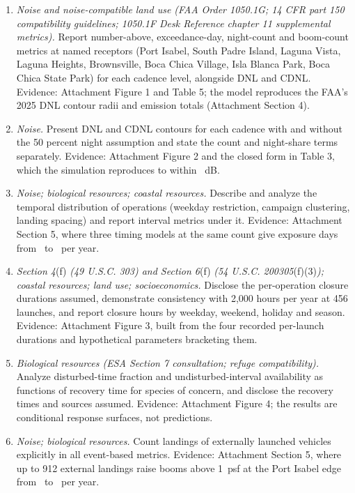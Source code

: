 \documentclass[11pt]{article}
\begin{document}
\begin{enumerate}[leftmargin=*, itemsep=2pt]
\item \textit{Noise and noise-compatible land use (FAA Order 1050.1G; 14 CFR part 150 compatibility guidelines; 1050.1F Desk Reference chapter 11 supplemental metrics).} Report number-above, exceedance-day, night-count and boom-count metrics at named receptors (Port Isabel, South Padre Island, Laguna Vista, Laguna Heights, Brownsville, Boca Chica Village, Isla Blanca Park, Boca Chica State Park) for each cadence level, alongside DNL and CDNL. Evidence: Attachment Figure 1 and Table 5; the model reproduces the FAA's 2025 DNL contour radii and emission totals (Attachment Section 4).
\item \textit{Noise.} Present DNL and CDNL contours for each cadence with and without the 50 percent night assumption and state the count and night-share terms separately. Evidence: Attachment Figure 2 and the closed form in Table 3, which the simulation reproduces to within \valEThreeNightCfMaxabsdiffDbOneDp~dB.
\item \textit{Noise; biological resources; coastal resources.} Describe and analyze the temporal distribution of operations (weekday restriction, campaign clustering, landing spacing) and report interval metrics under it. Evidence: Attachment Section 5, where three timing models at the same count give exposure days from \valETwoCampaignDaysNineZeroSpi~to \valETwoPoissonDaysNineZeroSpi~per year.
\item \textit{Section 4\nocorr}{\upshape(f)}\textit{ (49 U.S.C. 303) and Section 6\nocorr}{\upshape(f)}\textit{ (54 U.S.C. 200305\nocorr}{\upshape(f)(3)}\textit{); coastal resources; land use; socioeconomics.} Disclose the per-operation closure durations assumed, demonstrate consistency with 2,000 hours per year at 456 launches, and report closure hours by weekday, weekend, holiday and season. Evidence: Attachment Figure 3, built from the four recorded per-launch durations and hypothetical parameters bracketing them.
\item \textit{Biological resources (ESA Section 7 consultation; refuge compatibility).} Analyze disturbed-time fraction and undisturbed-interval availability as functions of recovery time for species of concern, and disclose the recovery times and sources assumed. Evidence: Attachment Figure 4; the results are conditional response surfaces, not predictions.
\item \textit{Noise; biological resources.} Count landings of externally launched vehicles explicitly in all event-based metrics. Evidence: Attachment Section 5, where up to 912 external landings raise booms above 1~psf at the Port Isabel edge from \valEOneExtBoomOnePortisabelZero~to \valEOneExtBoomOnePortisabelOne~per year.

\end{enumerate}
\end{document}
